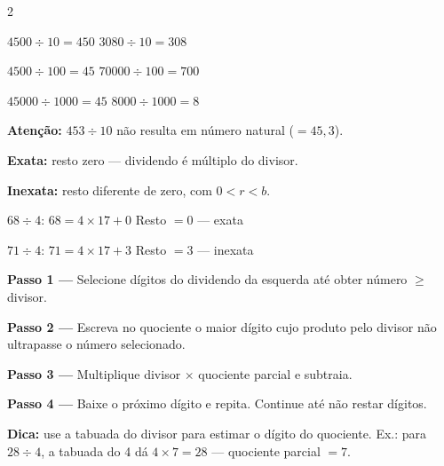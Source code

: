\documentclass[12pt,twoside]{article}
\begin{document}
\begin{multicols}{2}

$4500 \div 10 = 450$ \quad $3080 \div 10 = 308$

\vspace{4pt}
$4500 \div 100 = 45$ \quad $70000 \div 100 = 700$

\vspace{4pt}
$45000 \div 1000 = 45$ \quad $8000 \div 1000 = 8$

\vspace{4pt}
\textbf{Atenção:} $453 \div 10$ não resulta em número natural ($= 45{,}3$).


\textbf{Exata:} resto zero — dividendo é múltiplo do divisor.

\textbf{Inexata:} resto diferente de zero, com $0 < r < b$.


$68 \div 4$: $68 = 4 \times 17 + 0$ \quad Resto $= 0$ — exata \checkmark

$71 \div 4$: $71 = 4 \times 17 + 3$ \quad Resto $= 3$ — inexata


\textbf{Passo 1 —} Selecione dígitos do dividendo da esquerda até obter número $\geq$ divisor.

\textbf{Passo 2 —} Escreva no quociente o maior dígito cujo produto pelo divisor não ultrapasse o número selecionado.

\textbf{Passo 3 —} Multiplique divisor $\times$ quociente parcial e subtraia.

\textbf{Passo 4 —} Baixe o próximo dígito e repita. Continue até não restar dígitos.

\vspace{4pt}
\textbf{Dica:} use a tabuada do divisor para estimar o dígito do quociente. Ex.: para $28 \div 4$, a tabuada do 4 dá $4 \times 7 = 28$ — quociente parcial $= 7$.


\vspace{0.3cm}


\end{multicols}
\end{document}
